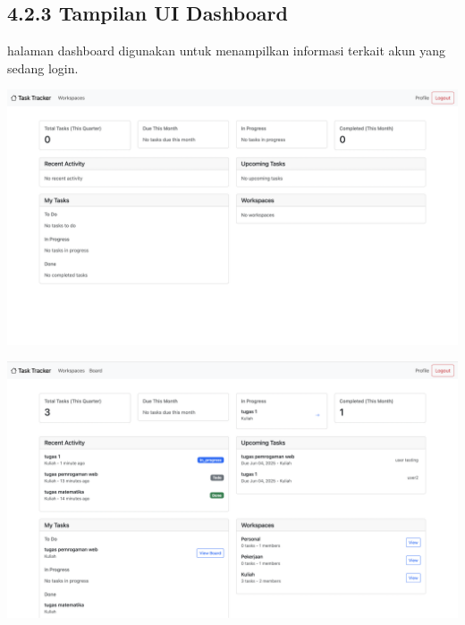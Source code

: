 \subsection*{4.2.3 Tampilan UI Dashboard}
halaman dashboard digunakan untuk menampilkan informasi terkait akun yang sedang login.
\begin{center}
  \includegraphics[width=1\textwidth]{assets/ui/empty_dashboard.png}
\end{center}
\begin{center}
  \includegraphics[width=1\textwidth]{assets/ui/user_dashboard_filled.png}
\end{center}

